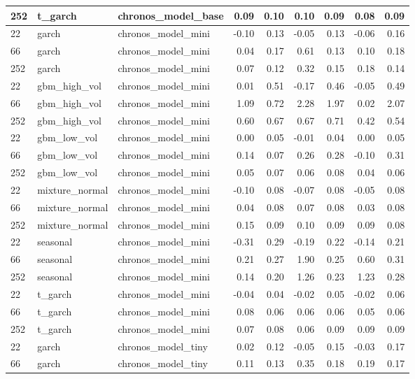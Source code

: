 {\begin{tabular}{lllrrrrrr}
252 & t\_garch & chronos\_model\_base & 0.09 & 0.10 & 0.10 & 0.09 & 0.08 & 0.09 \\
\midrule
22 & garch & chronos\_model\_mini & -0.10 & 0.13 & -0.05 & 0.13 & -0.06 & 0.16 \\
66 & garch & chronos\_model\_mini & 0.04 & 0.17 & 0.61 & 0.13 & 0.10 & 0.18 \\
252 & garch & chronos\_model\_mini & 0.07 & 0.12 & 0.32 & 0.15 & 0.18 & 0.14 \\
\midrule
22 & gbm\_high\_vol & chronos\_model\_mini & 0.01 & 0.51 & -0.17 & 0.46 & -0.05 & 0.49 \\
66 & gbm\_high\_vol & chronos\_model\_mini & 1.09 & 0.72 & 2.28 & 1.97 & 0.02 & 2.07 \\
252 & gbm\_high\_vol & chronos\_model\_mini & 0.60 & 0.67 & 0.67 & 0.71 & 0.42 & 0.54 \\
\midrule
22 & gbm\_low\_vol & chronos\_model\_mini & 0.00 & 0.05 & -0.01 & 0.04 & 0.00 & 0.05 \\
66 & gbm\_low\_vol & chronos\_model\_mini & 0.14 & 0.07 & 0.26 & 0.28 & -0.10 & 0.31 \\
252 & gbm\_low\_vol & chronos\_model\_mini & 0.05 & 0.07 & 0.06 & 0.08 & 0.04 & 0.06 \\
\midrule
22 & mixture\_normal & chronos\_model\_mini & -0.10 & 0.08 & -0.07 & 0.08 & -0.05 & 0.08 \\
66 & mixture\_normal & chronos\_model\_mini & 0.04 & 0.08 & 0.07 & 0.08 & 0.03 & 0.08 \\
252 & mixture\_normal & chronos\_model\_mini & 0.15 & 0.09 & 0.10 & 0.09 & 0.09 & 0.08 \\
\midrule
22 & seasonal & chronos\_model\_mini & -0.31 & 0.29 & -0.19 & 0.22 & -0.14 & 0.21 \\
66 & seasonal & chronos\_model\_mini & 0.21 & 0.27 & 1.90 & 0.25 & 0.60 & 0.31 \\
252 & seasonal & chronos\_model\_mini & 0.14 & 0.20 & 1.26 & 0.23 & 1.23 & 0.28 \\
\midrule
22 & t\_garch & chronos\_model\_mini & -0.04 & 0.04 & -0.02 & 0.05 & -0.02 & 0.06 \\
66 & t\_garch & chronos\_model\_mini & 0.08 & 0.06 & 0.06 & 0.06 & 0.05 & 0.06 \\
252 & t\_garch & chronos\_model\_mini & 0.07 & 0.08 & 0.06 & 0.09 & 0.09 & 0.09 \\
\midrule
22 & garch & chronos\_model\_tiny & 0.02 & 0.12 & -0.05 & 0.15 & -0.03 & 0.17 \\
66 & garch & chronos\_model\_tiny & 0.11 & 0.13 & 0.35 & 0.18 & 0.19 & 0.17 \\

\end{tabular}}
